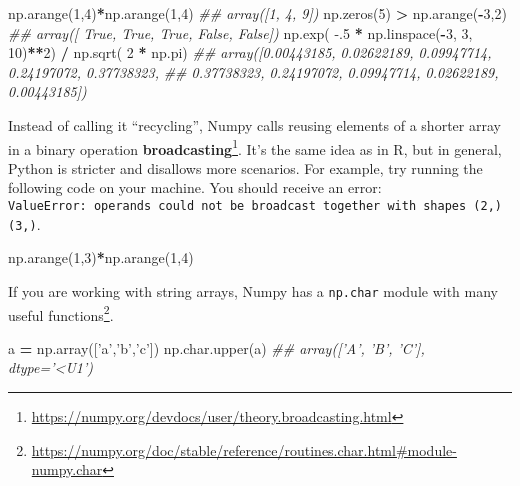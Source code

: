 \documentclass[12pt,krantz2]{krantz}
\makeatletter
\newenvironment{Shaded}{\begin{snugshade}}{\end{snugshade}}
\newcommand{\CommentTok}[1]{\textcolor[rgb]{0.37,0.37,0.37}{\textit{#1}}}
\newcommand{\DecValTok}[1]{\textcolor[rgb]{0.06,0.06,0.06}{#1}}
\newcommand{\FloatTok}[1]{\textcolor[rgb]{0.06,0.06,0.06}{#1}}
\newcommand{\NormalTok}[1]{#1}
\newcommand{\OperatorTok}[1]{\textcolor[rgb]{0.43,0.43,0.43}{\textbf{#1}}}
\newcommand{\StringTok}[1]{\textcolor[rgb]{0.5,0.5,0.5}{#1}}
\renewcommand{\href}[2]{#2\footnote{\url{#1}}}
\newenvironment{kframe}{%
\medskip{}
\setlength{\fboxsep}{.8em}
 \def\at@end@of@kframe{}%
 \ifinner\ifhmode%
  \def\at@end@of@kframe{\end{minipage}}%
  \begin{minipage}{\columnwidth}%
 \fi\fi%
 \def\FrameCommand##1{\hskip\@totalleftmargin \hskip-\fboxsep
 \colorbox{shadecolor}{##1}\hskip-\fboxsep
     \hskip-\linewidth \hskip-\@totalleftmargin \hskip\columnwidth}%
 \MakeFramed {\advance\hsize-\width
   \@totalleftmargin\z@ \linewidth\hsize
   \@setminipage}}%
 {\par\unskip\endMakeFramed%
 \at@end@of@kframe}
\renewenvironment{Shaded}{\begin{kframe}}{\end{kframe}}
\makeatother
\begin{document}
\begin{Shaded}
\begin{Highlighting}[]
\NormalTok{np.arange(}\DecValTok{1}\NormalTok{,}\DecValTok{4}\NormalTok{)}\OperatorTok{*}\NormalTok{np.arange(}\DecValTok{1}\NormalTok{,}\DecValTok{4}\NormalTok{)}
\CommentTok{## array([1, 4, 9])}
\NormalTok{np.zeros(}\DecValTok{5}\NormalTok{) }\OperatorTok{>}\NormalTok{ np.arange(}\OperatorTok{-}\DecValTok{3}\NormalTok{,}\DecValTok{2}\NormalTok{)}
\CommentTok{## array([ True,  True,  True, False, False])}
\NormalTok{np.exp( }\FloatTok{-.5} \OperatorTok{*}\NormalTok{ np.linspace(}\OperatorTok{-}\DecValTok{3}\NormalTok{, }\DecValTok{3}\NormalTok{, }\DecValTok{10}\NormalTok{)}\OperatorTok{**}\DecValTok{2}\NormalTok{) }\OperatorTok{/}\NormalTok{ np.sqrt( }\DecValTok{2} \OperatorTok{*}\NormalTok{ np.pi)}
\CommentTok{## array([0.00443185, 0.02622189, 0.09947714, 0.24197072, 0.37738323,}
\CommentTok{##        0.37738323, 0.24197072, 0.09947714, 0.02622189, 0.00443185])}
\end{Highlighting}
\end{Shaded}

Instead of calling it ``recycling'', Numpy calls reusing elements of a shorter array in a binary operation \href{https://numpy.org/devdocs/user/theory.broadcasting.html}{\textbf{broadcasting}}. It's the same idea as in R, but in general, Python is stricter and disallows more scenarios. For example, try running the following code on your machine. You should receive an error: \texttt{ValueError:\ operands\ could\ not\ be\ broadcast\ together\ with\ shapes\ (2,)\ (3,)}.

\begin{Shaded}
\begin{Highlighting}[]
\NormalTok{np.arange(}\DecValTok{1}\NormalTok{,}\DecValTok{3}\NormalTok{)}\OperatorTok{*}\NormalTok{np.arange(}\DecValTok{1}\NormalTok{,}\DecValTok{4}\NormalTok{)}
\end{Highlighting}
\end{Shaded}

If you are working with string arrays, Numpy has a \href{https://numpy.org/doc/stable/reference/routines.char.html\#module-numpy.char}{\texttt{np.char} module with many useful functions}.

\begin{Shaded}
\begin{Highlighting}[]
\NormalTok{a }\OperatorTok{=}\NormalTok{ np.array([}\StringTok{'a'}\NormalTok{,}\StringTok{'b'}\NormalTok{,}\StringTok{'c'}\NormalTok{])}
\NormalTok{np.char.upper(a)}
\CommentTok{## array(['A', 'B', 'C'], dtype='<U1')}
\end{Highlighting}
\end{Shaded}
\end{document}
